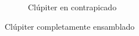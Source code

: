\begin{figure}[H]
\begin{subfigure}[c]{0.45\textwidth}
        \caption{Clúpiter en contrapicado}
        \label{fig:fotos_estructura_bottom}
    \end{subfigure}
    \label{fig:fotos_estructura}
    \caption{Clúpiter completamente ensamblado}
\end{figure}
